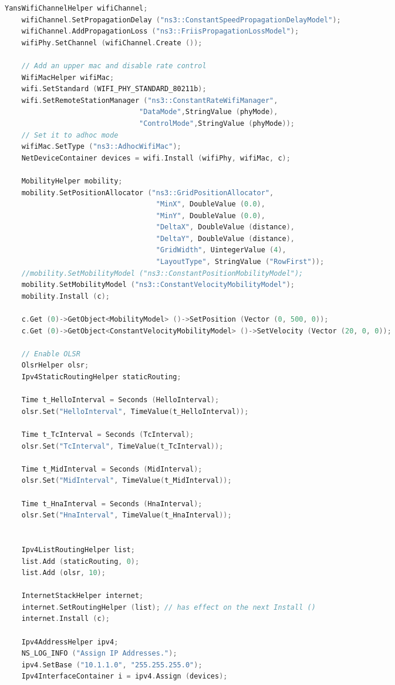 \documentclass[a4paper,12pt]{report}
\begin{document}
\begin{appendix}
\begin{spacing}{1.5}
\begin{lstlisting}[language=c++]
	YansWifiChannelHelper wifiChannel;
	wifiChannel.SetPropagationDelay ("ns3::ConstantSpeedPropagationDelayModel");
	wifiChannel.AddPropagationLoss ("ns3::FriisPropagationLossModel");
	wifiPhy.SetChannel (wifiChannel.Create ());

	// Add an upper mac and disable rate control
	WifiMacHelper wifiMac;
	wifi.SetStandard (WIFI_PHY_STANDARD_80211b);
	wifi.SetRemoteStationManager ("ns3::ConstantRateWifiManager",
								"DataMode",StringValue (phyMode),
								"ControlMode",StringValue (phyMode));
	// Set it to adhoc mode
	wifiMac.SetType ("ns3::AdhocWifiMac");
	NetDeviceContainer devices = wifi.Install (wifiPhy, wifiMac, c);

	MobilityHelper mobility;
	mobility.SetPositionAllocator ("ns3::GridPositionAllocator",
									"MinX", DoubleValue (0.0),
									"MinY", DoubleValue (0.0),
									"DeltaX", DoubleValue (distance),
									"DeltaY", DoubleValue (distance),
									"GridWidth", UintegerValue (4),
									"LayoutType", StringValue ("RowFirst"));
	//mobility.SetMobilityModel ("ns3::ConstantPositionMobilityModel");
	mobility.SetMobilityModel ("ns3::ConstantVelocityMobilityModel");
	mobility.Install (c);

	c.Get (0)->GetObject<MobilityModel> ()->SetPosition (Vector (0, 500, 0));
	c.Get (0)->GetObject<ConstantVelocityMobilityModel> ()->SetVelocity (Vector (20, 0, 0));

	// Enable OLSR
	OlsrHelper olsr;
	Ipv4StaticRoutingHelper staticRouting;

	Time t_HelloInterval = Seconds (HelloInterval);
	olsr.Set("HelloInterval", TimeValue(t_HelloInterval));

	Time t_TcInterval = Seconds (TcInterval);
	olsr.Set("TcInterval", TimeValue(t_TcInterval));

	Time t_MidInterval = Seconds (MidInterval);
	olsr.Set("MidInterval", TimeValue(t_MidInterval));

	Time t_HnaInterval = Seconds (HnaInterval);
	olsr.Set("HnaInterval", TimeValue(t_HnaInterval));


	Ipv4ListRoutingHelper list;
	list.Add (staticRouting, 0);
	list.Add (olsr, 10);

	InternetStackHelper internet;
	internet.SetRoutingHelper (list); // has effect on the next Install ()
	internet.Install (c);

	Ipv4AddressHelper ipv4;
	NS_LOG_INFO ("Assign IP Addresses.");
	ipv4.SetBase ("10.1.1.0", "255.255.255.0");
	Ipv4InterfaceContainer i = ipv4.Assign (devices);


\end{lstlisting}
\end{spacing}
\end{appendix}
\end{document}
